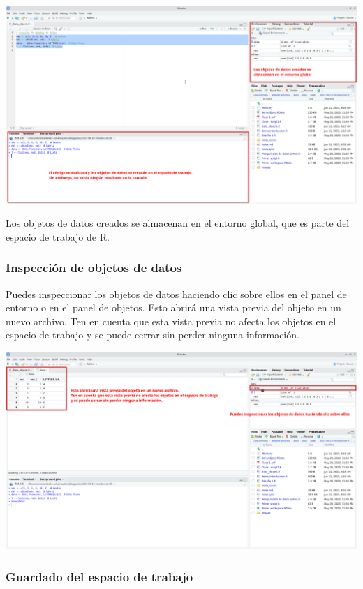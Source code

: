 \documentclass[
  a4paper,
]{article}
\begin{document}
\includegraphics{images/Screenshot_20230611_094001.png}

Los objetos de datos creados se almacenan en el entorno global, que es
parte del espacio de trabajo de R.

\hypertarget{inspecciuxf3n-de-objetos-de-datos}{%
\subsubsection{Inspección de objetos de
datos}\label{inspecciuxf3n-de-objetos-de-datos}}

Puedes inspeccionar los objetos de datos haciendo clic sobre ellos en el
panel de entorno o en el panel de objetos. Esto abrirá una vista previa
del objeto en un nuevo archivo. Ten en cuenta que esta vista previa no
afecta los objetos en el espacio de trabajo y se puede cerrar sin perder
ninguna información.

\includegraphics{images/Screenshot_20230611_094530.png}

\hypertarget{guardado-del-espacio-de-trabajo}{%
\subsubsection{Guardado del espacio de
trabajo}\label{guardado-del-espacio-de-trabajo}}
\end{document}
